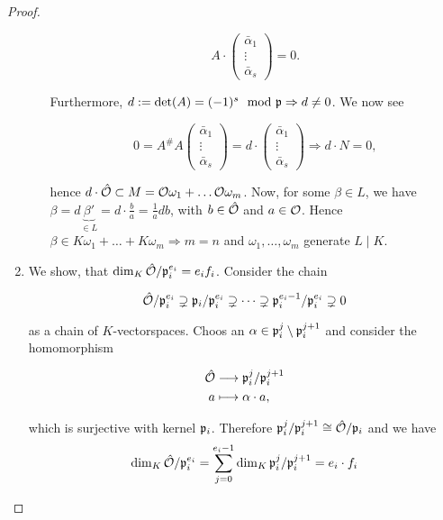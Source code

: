 \begin{proof}
\begin{enumerate}[Step 1:]
\begin{enumerate}[(1)]
			 \[
			 A \cdot
			 \begin{pmatrix}
			 	\bar\alpha_1 \\
			 	\vdots \\
			 	\bar\alpha_s
			 \end{pmatrix}
			 = 0.	 
			 \]
			 
			 Furthermore, $d:=\det(A) = (-1)^s \mod {\mathfrak{p}} \Rightarrow d \neq 0$. We now see
			 
			 \[
			 0 = A^\#A
			 \begin{pmatrix}
			 \bar\alpha_1 \\
			 \vdots \\
			 \bar\alpha_s
			 \end{pmatrix}	 
			 = d \cdot
			 \begin{pmatrix}
			 \bar\alpha_1 \\
			 \vdots \\
			 \bar\alpha_s
			 \end{pmatrix}		 
			 \Longrightarrow d \cdot N = 0,
			 \]
			 
			 hence $d \cdot \hat{\mathcal{O}} \subset M = \mathcal{O}\omega_1 + \dots \mathcal{O}\omega_m$.
			 Now, for some $\beta \in L$, we have $\beta = d\underbrace{\beta'}_{\in L} = d \cdot \frac{b}{a} = \frac{1}{a}db$, with $b \in \hat{\mathcal{O}}$ and $a \in \mathcal{O}$. Hence $\beta \in K\omega_1 + \dots + K\omega_m \Rightarrow m = n$ and $\omega_1, \dots, \omega_m$ generate $L \mid K$.			 
		\end{enumerate}
		
		\bigskip
		
		 \item We show, that $\dim_K \hat{\mathcal{O}}/\mathfrak{p}_i^{e_i} = e_if_i$. Consider the chain
		 
		 \[
		 \hat{\mathcal{O}}/\mathfrak{p}_i^{e_i} \supsetneq \mathfrak{p}_i/\mathfrak{p}_i^{e_i} \supsetneq \dots \supsetneq \mathfrak{p}_i^{e_i-1}/\mathfrak{p}_i^{e_i} \supsetneq 0
		  \]
		  
		  as a chain of $K$-vectorspaces. Choos an $\alpha \in \mathfrak{p}_i^j \setminus \mathfrak{p}_i^{j+1}$ and consider the homomorphism
		  
		  \[
		  \begin{aligned}
		   \hat{\mathcal{O}} &\longrightarrow \mathfrak{p}_i^j/\mathfrak{p}_i^{j+1} \\
		   a &\longmapsto \alpha \cdot a,
		   \end{aligned}
		   \]
		   
		  which is surjective with kernel $\mathfrak{p}_i$. Therefore $\mathfrak{p}_i^j / \mathfrak{p}_i^{j+1} \cong \hat{\mathcal{O}} / \mathfrak{p}_i$ and we have
		  \[  \dim_K \hat{\mathcal{O}}/\mathfrak{p}_i^{e_i} = \sum_{j=0}^{e_i-1} \dim_K \mathfrak{p}_i^j / \mathfrak{p}_i^{j+1} = e_i \cdot f_i  \]	   	
	\end{enumerate}
\end{proof}